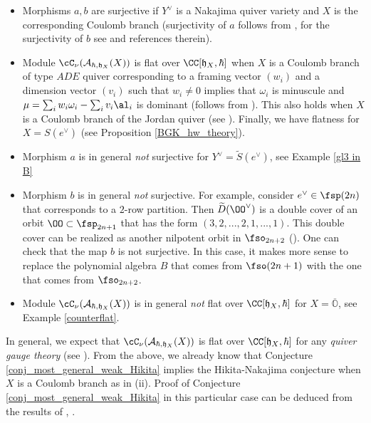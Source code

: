 \documentclass[12pt]{amsart}
\begin{document}
\begin{itemize}
    \item[(i)] Morphisms $a,b$ are surjective if $Y^\vee$ is a Nakajima quiver variety and $X$ is the corresponding Coulomb branch (surjectivity of $a$ follows from \cite[Corollary 1.5]{kirwan_surj_quiv}, for the surjectivity of $b$ see \cite[Proposition 8.7]{ksh} and references therein).
    \item[(ii)] Module $\cC_\nu(\mathcal{A}_{\hbar,\mathfrak{h}_X}(X))$ is flat over $\CC[\mathfrak{h}_{X},\hbar]$ when $X$ is a Coulomb branch of type $ADE$ quiver corresponding to a framing vector $(w_i)$  and a dimension vector $(v_i)$ such that $w_i \neq 0$ implies that $\omega_i$ is minuscule and $\mu=\sum_{i}w_i\omega_i - \sum_i v_i\al_i$ is dominant (follows from \cite[Section 8.2]{KamnitzerTingleyWebsterWeeksYacobi}). This also holds when $X$ is a Coulomb branch of the Jordan quiver (see \cite[Appendix A]{ksh}). Finally, we have flatness for $X=S(e^\vee)$ (see Proposition \ref{BGK_hw_theory}).
    \item[(iii)] Morphism $a$ is in general {\emph{not}} surjective for $Y^\vee=\widetilde{S}(e^\vee)$, see Example \ref{gl3 in B}
    \item[(iv)] Morphism $b$ is in general {\emph{not}} surjective. For example, consider $e^\vee\in \fsp({2n})$ that corresponds to a $2$-row partition. Then $\widetilde{D}(\OO^\vee)$ is a double cover of an orbit $\OO\subset \fsp_{2n+1}$ that has the form $(3,2,...,2,1,...,1)$. This double cover can be realized as another nilpotent orbit in $\fso_{2n+2}$ (\cite[Proposition 2.12]{FJLS2023}). One can check that the map $b$ is not surjective. In this case, it makes more sense to replace the polynomial algebra $B$ that comes from $\fso({2n+1})$ with the one that comes from $\fso_{2n+2}$.
    \item[(v)] Module $\cC_\nu(\mathcal{A}_{\hbar,\mathfrak{h}_X}(X))$ is in general {\emph{not}} flat over $\CC[\mathfrak{h}_{X},\hbar]$ for $X=\overline{\mathbb{O}}$, see Example \ref{counterflat}.
\end{itemize}

In general, we expect that $\cC_\nu(\mathcal{A}_{\hbar,\mathfrak{h}_X}(X))$ is flat over $\CC[\mathfrak{h}_{X},\hbar]$ for any {\emph{quiver gauge theory}} (see \cite[Conjecture 8.3]{ksh}).
From the above, we already know that Conjecture \ref{conj_most_general_weak_Hikita} implies the Hikita-Nakajima conjecture when $X$ is a Coulomb branch as in (ii). Proof of Conjecture \ref{conj_most_general_weak_Hikita} in this particular case can be deduced from the results of \cite{KamnitzerTingleyWebsterWeeksYacobi}, \cite{catO_yang}. 
\end{document}
